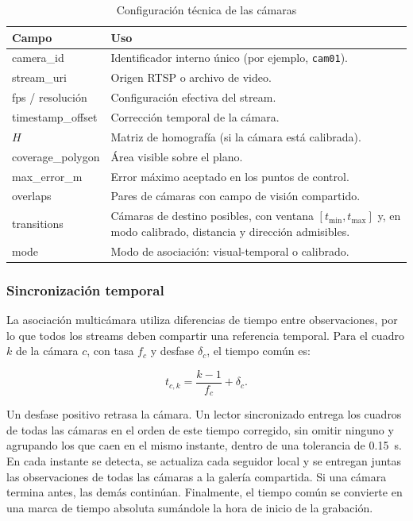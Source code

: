 \documentclass[12pt,a4paper]{article}
\begin{document}
\begin{table}[H]
\caption{Configuración técnica de las cámaras}
\label{tab:camera_configuration}
\centering
\footnotesize
\begin{tabular}{|p{}|p{}|}
\hline
\textbf{Campo} & \textbf{Uso} \\
\hline
camera\_id & Identificador interno único (por ejemplo, \texttt{cam01}). \\
\hline
stream\_uri & Origen RTSP o archivo de video. \\
\hline
fps / resolución & Configuración efectiva del stream. \\
\hline
timestamp\_offset & Corrección temporal de la cámara. \\
\hline
$H$ & Matriz de homografía (si la cámara está calibrada). \\
\hline
coverage\_polygon & Área visible sobre el plano. \\
\hline
max\_error\_m & Error máximo aceptado en los puntos de control. \\
\hline
overlaps & Pares de cámaras con campo de visión compartido. \\
\hline
transitions & Cámaras de destino posibles, con ventana $[t_{\min},t_{\max}]$ y, en modo calibrado, distancia y dirección admisibles. \\
\hline
mode & Modo de asociación: visual-temporal o calibrado. \\
\hline
\end{tabular}
\end{table}

\subsubsection{Sincronización temporal}

La asociación multicámara utiliza diferencias de tiempo entre
observaciones, por lo que todos los streams deben compartir una
referencia temporal. Para el cuadro $k$ de la cámara $c$, con tasa $f_c$
y desfase $\delta_c$, el tiempo común es:

\begin{equation}
t_{c,k}=\frac{k-1}{f_c}+\delta_c .
\end{equation}

Un desfase positivo retrasa la cámara. Un lector sincronizado entrega
los cuadros de todas las cámaras en el orden de este tiempo corregido,
sin omitir ninguno y agrupando los que caen en el mismo instante, dentro
de una tolerancia de 0.15~s. En cada instante se detecta, se actualiza
cada seguidor local y se entregan juntas las observaciones de todas las
cámaras a la galería compartida. Si una cámara termina antes, las demás
continúan. Finalmente, el tiempo común se convierte en una marca de
tiempo absoluta sumándole la hora de inicio de la grabación.
\end{document}
